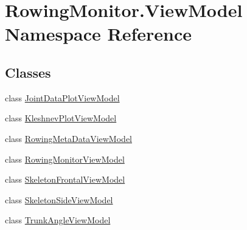 \hypertarget{namespace_rowing_monitor_1_1_view_model}{}\section{Rowing\+Monitor.\+View\+Model Namespace Reference}
\label{namespace_rowing_monitor_1_1_view_model}
\subsection*{Classes}
\begin{DoxyCompactItemize}
\item 
class \hyperlink{class_rowing_monitor_1_1_view_model_1_1_joint_data_plot_view_model}{Joint\+Data\+Plot\+View\+Model}
\item 
class \hyperlink{class_rowing_monitor_1_1_view_model_1_1_kleshnev_plot_view_model}{Kleshnev\+Plot\+View\+Model}
\item 
class \hyperlink{class_rowing_monitor_1_1_view_model_1_1_rowing_meta_data_view_model}{Rowing\+Meta\+Data\+View\+Model}
\item 
class \hyperlink{class_rowing_monitor_1_1_view_model_1_1_rowing_monitor_view_model}{Rowing\+Monitor\+View\+Model}
\item 
class \hyperlink{class_rowing_monitor_1_1_view_model_1_1_skeleton_frontal_view_model}{Skeleton\+Frontal\+View\+Model}
\item 
class \hyperlink{class_rowing_monitor_1_1_view_model_1_1_skeleton_side_view_model}{Skeleton\+Side\+View\+Model}
\item 
class \hyperlink{class_rowing_monitor_1_1_view_model_1_1_trunk_angle_view_model}{Trunk\+Angle\+View\+Model}
\end{DoxyCompactItemize}
